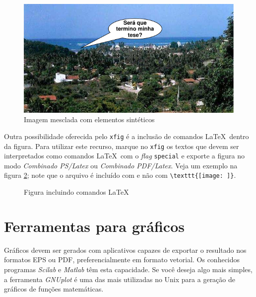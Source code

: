 \begin{figure}[htb] \begin{center}
\includegraphics{textuais/04-problema/figuras/pensador}
\caption{Imagem mesclada com elementos sintéticos}
\label{Fig:pensador}
\end{center} \end{figure}

Outra possibilidade oferecida pelo \texttt{xfig} é a inclusão de comandos
\LaTeX\ dentro da figura. Para utilizar este recurso,
marque no \texttt{xfig} os textos que devem ser interpretados como
comandos \LaTeX\ com o \emph{flag} \texttt{special} e exporte a figura
no modo \emph{Combinado PS/Latex} ou \emph{Combinado PDF/Latex}. Veja
um exemplo na figura \ref{Fig:combinado}; note que o arquivo é incluído com
\verb|| e não com \verb|\texttt{[image: ]}|.

\newcommand{\formulagrande}{$\frac{G_3G_4}{1-G_3G_4H_1}$}
\begin{figure}[htb] \begin{center}
\caption{Figura incluindo comandos \LaTeX}
\label{Fig:combinado}
\end{center} \end{figure}

\section{Ferramentas para gráficos}
\label{Sec:graficos}

Gráficos devem ser gerados com aplicativos capazes de exportar o
resultado nos formatos EPS ou PDF, preferencialmente em formato
vetorial. Os conhecidos programas \emph{Scilab} e \emph{Matlab} têm
esta capacidade. Se você deseja algo mais simples, a ferramenta
\textit{GNUplot} é uma das mais utilizadas no Unix para a geração de
gráficos de funções matemáticas.


